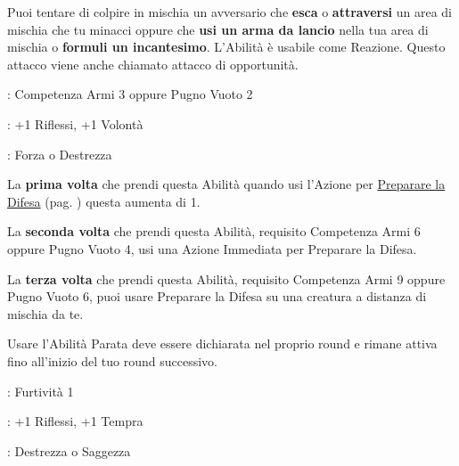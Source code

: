 \begin{multicols}{2}
\label{attaccoopportunita}

Puoi tentare di colpire in mischia un avversario che \textbf{esca} o \textbf{attraversi} un area di mischia che tu minacci oppure che \textbf{usi un arma da lancio} nella tua area di mischia o \textbf{formuli un incantesimo}. L'Abilità è usabile come Reazione. Questo attacco viene anche chiamato attacco di opportunità.

\begin{description}[noitemsep, topsep=0pt, parsep=0pt, partopsep=0pt, leftmargin=0cm, labelwidth=2.5cm]
    \item[\textbf{Requisito}]: Competenza Armi 3 oppure Pugno Vuoto 2
    \item[\textbf{Tiri Salvezza}]: +1 Riflessi, +1 Volontà
    \item[\textbf{Caratteristica}]: Forza o Destrezza
\end{description}

La \textbf{prima volta} che prendi questa Abilità quando usi l'Azione per \hyperlink{preparareladifesa}{Preparare la Difesa} (pag. \pageref{preparareladifesa}) questa aumenta di 1.

La \textbf{seconda volta} che prendi questa Abilità, requisito Competenza Armi 6 oppure Pugno Vuoto 4, usi una Azione Immediata per Preparare la Difesa.

La \textbf{terza volta} che prendi questa Abilità, requisito Competenza Armi 9 oppure Pugno Vuoto 6, puoi usare Preparare la Difesa su una creatura a distanza di mischia da te.

Usare l'Abilità Parata deve essere dichiarata nel proprio round e rimane attiva fino all'inizio del tuo round successivo.


%

\begin{description}[noitemsep, topsep=0pt, parsep=0pt, partopsep=0pt, leftmargin=0cm, labelwidth=2.5cm]
    \item[\textbf{Requisito}]: Furtività 1
    \item[\textbf{Tiri Salvezza}]: +1 Riflessi, +1 Tempra
    \item[\textbf{Caratteristica}]: Destrezza o Saggezza
\end{description}


\end{multicols}
